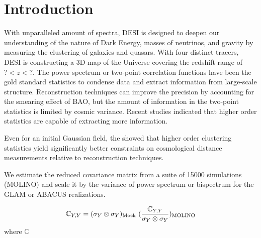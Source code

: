 \section{Introduction}
\label{sec:introduction}
With unparalleled amount of spectra, DESI is designed to deepen our understanding of the nature of Dark Energy, masses of neutrinos, and gravity by measuring the clustering of galaxies and quasars. With four distinct tracers, DESI is constructing a 3D map of the Universe covering the redshift range of $? < z < ?$. The power spectrum or two-point correlation functions have been the gold standard statistics to condense data and extract information from large-scale structure. Reconstruction techniques can improve the precision by accounting for the smearing effect of BAO, but the amount of information in the two-point statistics is limited by cosmic variance. Recent studies indicated that higher order statistics are capable of extracting more information.

Even for an initial Gaussian field, the \cite{samushia2021information} showed that higher order clustering statistics yield significantly better constraints on cosmological distance measurements relative to reconstruction techniques. 

We estimate the reduced covariance matrix from a suite of 15000 simulations (MOLINO) and scale it by the variance of power spectrum or bispectrum for the GLAM or ABACUS realizations.

\begin{equation}
	\mathbb{C}_{Y,Y} = (\sigma_{Y} \otimes \sigma_{Y})_{\rm Mock} ~ (\frac{\mathbb{C}_{Y,Y}}{\sigma_{Y} \otimes \sigma_{Y}})_{\rm MOLINO}
\end{equation}
where $\mathbb{C}$

